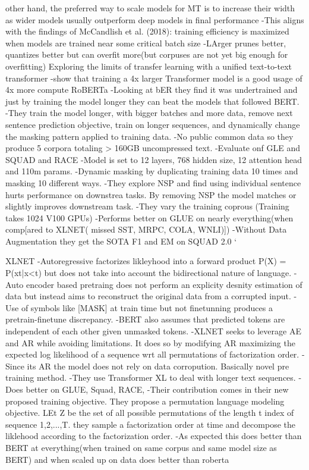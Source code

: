 other hand, the preferred way to scale models for MT is
to increase their width as wider models usually outperform
deep models in final performance
-This aligns with the findings of
McCandlish et al. (2018): training efficiency is maximized
when models are trained near some critical batch size
-LArger prunes better, quantizes better but can overfit more(but corpuses are not yet big enough for overfitting)
Exploring the limits of transfer learning with a unified text-to-text transformer
-show that training a 4x larger Transformer model is a good usage of 4x more compute
RoBERTa 
-Looking at bER they find it was undertrained and just by training the model longer they can beat the models that followed BERT. 
-They train the model longer, with bigger batches and more data, remove next sentence prediction objective, train on longer sequences, and dynamically change the masking pattern applied to training data. 
-No public common data so they produce 5 corpora totaling > 160GB uncompressed text. 
-Evaluate onf GLE and SQUAD and RACE
-Model is set to 12 layers, 768 hidden size, 12 attention head and 110m params. 
-Dynamic masking by duplicating training data 10 times and masking 10 different ways. 
-They explore NSP and find using individual sentence hurts performance on downstrea tasks. By removing NSP the model matches or slightly improves downstream task.
-They vary the training coprous (Training takes 1024 V100 GPUs)
-Performs better on GLUE on nearly everything(when comp[ared to XLNET( missed SST, MRPC, COLA, WNLI)])
-Without Data Augmentation they get the SOTA F1 and EM on SQUAD 2.0 `

XLNET
-Autoregressive factorizes likleyhood into a forward product P(X) = P(xt|x<t) but does not take into account the bidirectional nature of language.
-Auto encoder based pretraing does not perform an explicity desnity estimation of data but instead aims to reconstruct the original data from a corrupted input. 
-Use of symbols like [MASK] at train time but not finetunning produces a pretrain-finetune discrepancy.
-BERT also assumes that predicted tokens are independent of each other given unmasked tokens. 
-XLNET seeks to leverage AE and AR while avoiding limitations. It does so by modifying AR maximizing the expected log likelihood of a sequence wrt all permutations of factorization order. 
-Since its AR the model does not rely on data corropution. Basically novel pre training method.
-They use Transformer XL to deal with longer text sequences. 
-Does better on GLUE, Squad, RACE,
-Their contribution comes in their new proposed training objective. They propose a permutation language modeling objective. LEt Z be the set of all possible permutations of the length t index of sequence 1,2,...,T.  they sample a factorization order at time and decompose the liklehood according to the factorization order. 
-As expected this does better than BERT at everything(when trained on same corpus and same model size as BERT) and when scaled up on data  does better than roberta 


